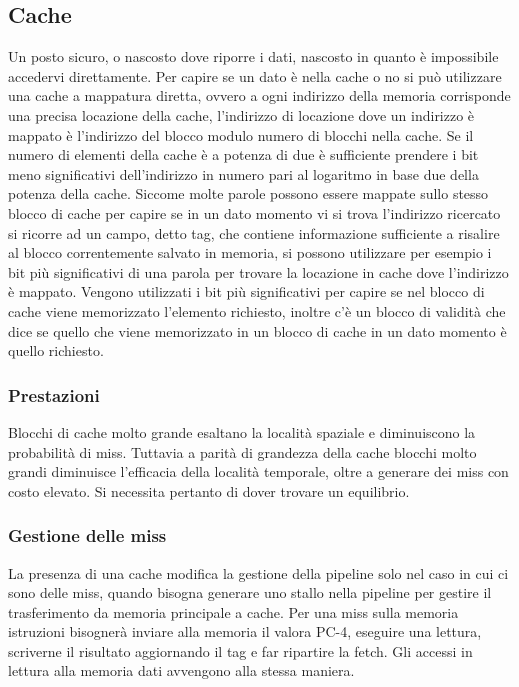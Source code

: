 \subsection{Cache}
Un posto sicuro, o nascosto dove riporre i dati, nascosto in quanto \`e impossibile accedervi direttamente. Per capire se un dato \`e nella cache o no si pu\`o 
utilizzare una cache a mappatura diretta, ovvero a ogni indirizzo della memoria corrisponde una precisa locazione della cache, l'indirizzo di locazione dove un indirizzo
\`e mappato \`e l'indirizzo del blocco modulo numero di blocchi nella cache. Se il numero di elementi della cache \`e a potenza di due \`e sufficiente prendere i bit 
meno significativi dell'indirizzo in numero pari al logaritmo in base due della potenza della cache. Siccome molte parole possono essere mappate sullo stesso blocco di 
cache per capire se in un dato momento vi si trova l'indirizzo ricercato si ricorre ad un campo, detto tag, che contiene informazione sufficiente a risalire al blocco 
correntemente salvato in memoria, si possono utilizzare per esempio i bit pi\`u significativi di una parola per trovare la locazione in cache dove l'indirizzo \`e 
mappato. Vengono utilizzati i bit pi\`u significativi per capire se nel blocco di cache viene memorizzato l'elemento richiesto, inoltre c'\`e un blocco di validit\`a
che dice se quello che viene memorizzato in un blocco di cache in un dato momento \`e quello richiesto. 
\subsubsection{Prestazioni}
Blocchi di cache molto grande esaltano la localit\`a spaziale e diminuiscono la probabilit\`a di miss. Tuttavia a parit\`a di grandezza della cache blocchi molto grandi 
diminuisce l'efficacia della localit\`a temporale, oltre a generare dei miss con costo elevato. Si necessita pertanto di dover trovare un equilibrio. 
\subsubsection{Gestione delle miss}
La presenza di una cache modifica la gestione della pipeline solo nel caso in cui ci sono delle miss, quando bisogna generare uno stallo nella pipeline per gestire il
trasferimento da memoria principale a cache. Per una miss sulla memoria istruzioni bisogner\`a inviare alla memoria il valora PC-4, eseguire una lettura, scriverne il
risultato aggiornando il tag e far ripartire la fetch. Gli accessi in lettura alla memoria dati avvengono alla stessa maniera.
